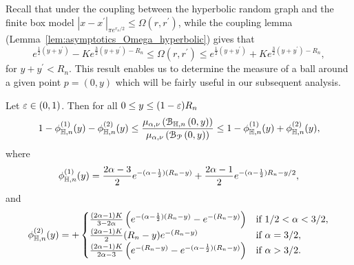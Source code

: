 Recall that under the coupling between the hyperbolic random graph and the finite box model $|x-x^\prime|_{\pi e^{r_n/2}} \le \Omega(r,r^\prime)$, while the coupling lemma (Lemma~\ref{lem:asymptotics_Omega_hyperbolic}) gives that  
\[
	e^{\frac{1}{2}(y+y^\prime)} - K e^{\frac{3}{2}(y+y^\prime) - R_n} \leq \Omega(r, r^\prime) 
		\leq  e^{\frac{1}{2}(y+y^\prime)} + K e^{\frac{3}{2}(y+y^\prime) - R_n},
\]
for $y + y^\prime < R_n$. This result enables us to determine the measure of a ball around a given point $p=(0,y)$ which will be fairly useful in our subsequent analysis. 

\begin{lemma}\label{lem:average_degree_hyperbolic}
Let $\varepsilon \in (0, 1)$. Then for all $0 \le y \le (1 - \varepsilon)R_n$
\[
	 1 - \phi_{\mathbb{H},n}^{(1)}(y) - \phi_{\mathbb{H},n}^{(2)}(y) \le \frac{\mu_{\alpha,\nu}\left({\mathcal B}_{\mathbb{H},n}\left(0,y\right)\right)}{\mu_{\alpha,\nu}\left({\mathcal B}_{{\mathcal P}}\left(0,y\right)\right)} 
	 \le 1 - \phi_{\mathbb{H},n}^{(1)}(y) + \phi_{\mathbb{H},n}^{(2)}(y),
\]
where
\[
	\phi_{\mathbb{H},n}^{(1)}(y) = \frac{2\alpha - 3}{2} e^{-(\alpha - \frac{1}{2})(R_n - y)} 
		+ \frac{2\alpha - 1}{2}e^{-(\alpha - \frac{1}{2})R_n - y/2},
\]
and
\[
	\phi_{\mathbb{H},n}^{(2)}(y) = 
	+ \begin{cases}
			\frac{(2\alpha - 1)K}{3 - 2\alpha}\left(e^{-(\alpha - \frac{1}{2})(R_n - y)} - e^{-(R_n - y)}\right)
			&\mbox{if } 1/2 < \alpha < 3/2,\\
			\frac{(2\alpha -1)K}{2} (R_n - y)e^{-(R_n - y)} &\mbox{if } \alpha = 3/2,\\
			\frac{(2\alpha - 1)K}{2\alpha - 3} \left(e^{-(R_n - y)} - e^{-(\alpha - \frac{1}{2})(R_n - y)}\right)
			&\mbox{if } \alpha > 3/2.
		\end{cases}
\]
\end{lemma}


